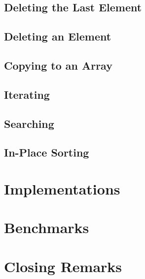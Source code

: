 \documentclass{article}
\begin{document}
	\subsection{Deleting the Last Element}
	
	\subsection{Deleting an Element}
	
	\subsection{Copying to an Array}
	
	\subsection{Iterating}
	
	\subsection{Searching}
	
	\subsection{In-Place Sorting}
	
	\section{Implementations}
	\label{Implementations}
	
	\section{Benchmarks}
	\label{Benchmarks}
	
	\section{Closing Remarks}
	\label{Closing Remarks}
	
\end{document}
